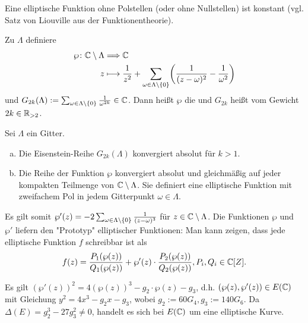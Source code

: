 Eine elliptische Funktion ohne Polstellen (oder ohne Nullstellen) ist konstant (vgl. Satz von Liouville aus der Funktionentheorie).

\begin{defn}
	Zu $\Lambda$ definiere
	\begin{equation}
	\begin{aligned}
		\wp \colon \CC \setminus \Lambda &\Longrightarrow \CC \\
		z &\longmapsto \frac{1}{z^2} + \sum_{\omega \in \Lambda \setminus \setnull} \enbrace*{\frac{1}{(z-\omega)^2} - \frac{1}{\omega^2}}
	\end{aligned}
	\end{equation}
	und $G_{2k}(\Lambda) := \sum_{\omega \in \Lambda \setminus \{0\}} \frac{1}{\omega^{2k}} \in \mathbb{C}$. Dann heißt $\wp$ die  und $G_{2k}$ heißt  vom Gewicht $2k \in \mathbb{R}_{>2}$.
\end{defn}

\begin{satz}
	Sei $\Lambda$ ein Gitter.
	\begin{enumerate}[(a)]
		\item Die Eisenstein-Reihe $G_{2k}(\Lambda)$ konvergiert absolut für $k > 1$.
		\item Die Reihe der Funktion $\wp$ konvergiert absolut und gleichmäßig auf jeder kompakten Teilmenge von $\mathbb{C} \setminus \Lambda$.
		Sie definiert eine elliptische Funktion mit zweifachem Pol in jedem Gitterpunkt $\omega \in \Lambda$.
	\end{enumerate}
\end{satz}

Es gilt somit $\wp'(z) = -2 \sum_{\omega \in \Lambda \setminus \{0\}} \frac{1}{(z-\omega)^3}$ für $z \in \mathbb{C} \setminus \Lambda$. 
Die Funktionen $\wp$ und $\wp'$ liefern den "Prototyp" elliptischer Funktionen:
Man kann zeigen, dass jede elliptische Funktion $f$ schreibbar ist als
\[
	f(z) = \frac{P_1(\wp(z))}{Q_1(\wp(z))} + \wp'(z) \cdot \frac{P_2(\wp(z))}{Q_2(\wp(z))}, P_i, Q_i \in \mathbb{C}[Z].
\]

\begin{satz}
	Es gilt $(\wp'(z))^2 = 4(\wp(z))^3 - g_2 \cdot \wp(z) - g_3$, d.h. $(\wp(z),\wp'(z)) \in E(\mathbb{C})$ mit Gleichung $y^2 = 4x^3 - g_2 x - g_3$, wobei $g_2 := 60 G_4, g_3 := 140 G_6$.
	Da $\Delta(E) = g_2^3 - 27g_3^2 \neq 0$, handelt es sich bei $E(\mathbb{C})$ um eine elliptische Kurve.
\end{satz}

